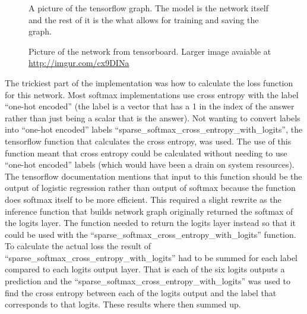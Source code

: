 \documentclass[12pt,twocolumn,letterpaper]{article}
\begin{document}
\begin{figure}[t]
\begin{center}
\end{center}
   \caption{A picture of the tensorflow graph. The model is the network itself 
   and the rest of it is the what allows for training and saving the graph.}
\label{fig:model image}
\end{figure}

\begin{figure*}
\begin{center}
\end{center}
   \caption{Picture of the network from tensorboard. 
   Larger image avaiable at \url{http://imgur.com/cx9DINa}}
\label{fig:network figure}
\end{figure*}

The trickiest part of the implementation was how to calculate the loss function 
for this network. Most softmax implementations use cross entropy with the 
label ``one-hot encoded'' (the label is a vector that has a 1 in the index of the 
answer rather than just being a scalar that is the answer). Not wanting to 
convert labels into ``one-hot encoded'' labels ``sparse\_softmax\_cross\_entropy\_with\_logits'', 
the tensorflow function that calculates the cross entropy, was used. The use of 
this function meant that cross entropy could be calculated  
without needing to use ``one-hot encoded'' labels (which would have been a drain 
on system resources). The tensorflow documentation 
mentions that input to this function should be the output of logistic regression 
rather than output of softmax because the function does softmax itself to be more 
efficient. This required a slight rewrite as the inference function that builds 
network graph originally returned the softmax of the logits layer. The function 
needed to return the logits layer instead so that it could be used with the 
``sparse\_softmax\_cross\_entropy\_with\_logits'' function. To calculate the 
actual loss the result of ``sparse\_softmax\_cross\_entropy\_with\_logits'' had 
to be summed for each label compared to each logits output layer. That is each 
of the six logits outputs a prediction and the 
``sparse\_softmax\_cross\_entropy\_with\_logits'' was used to find the cross 
entropy between each of the logits output and the label that corresponds to that 
logits. These results where then summed up. 
\end{document}
